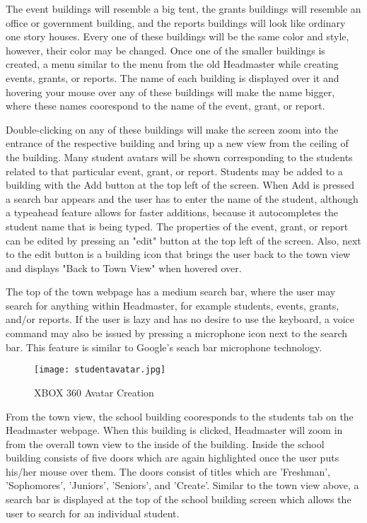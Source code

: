 \documentclass[11pt]{article}
\begin{document}
The event buildings will resemble a big tent, the grants buildings will resemble an office or government building, and the reports buildings will look like ordinary one story houses. Every one of these buildings will be the same color and style, however, their color may be changed. Once one of the smaller buildings is created, a menu similar to the menu from the old Headmaster while creating events, grants, or reports. The name of each building is displayed over it and hovering your mouse over any of these buildings will make the name bigger, where these names coorespond to the name of the event, grant, or report.

Double-clicking on any of these buildings will make the screen zoom into the entrance of the respective building and bring up a new view from the ceiling of the building. Many student avatars will be shown corresponding to the students related to that particular event, grant, or report. Students may be added to a building with the Add button at the top left of the screen. When Add is pressed a search bar appears and the user has to enter the name of the student, although a typeahead feature allows for faster additions, because it autocompletes the student name that is being typed. The properties of the event, grant, or report can be edited by pressing an "edit" button at the top left of the screen. Also, next to the edit button is a building icon that brings the user back to the town view and displays "Back to Town View" when hovered over.

 The top of the town webpage has a medium search bar, where the user may search for anything within Headmaster, for example students, events, grants, and/or reports. If the user is lazy and has no desire to use the keyboard, a voice command may also be issued by pressing a microphone icon next to the search bar. This feature is similar to Google's seach bar microphone technology. 

\begin{figure}
\centering
\texttt{[image: studentavatar.jpg]}
\caption{XBOX 360 Avatar Creation}
\label{avatar}
\end{figure}

From the town view, the school building cooresponds to the students tab on the Headmaster webpage. When this building is clicked, Headmaster will zoom in from the overall town view to the inside of the building. Inside the school building consists of five doors which are again highlighted once the user puts his/her mouse over them. The doors consist of titles which are 'Freshman', 'Sophomores', 'Juniors', 'Seniors', and 'Create'. Similar to the town view above, a search bar is displayed at the top of the school building screen which allows the user to search for an individual student.
\end{document}
